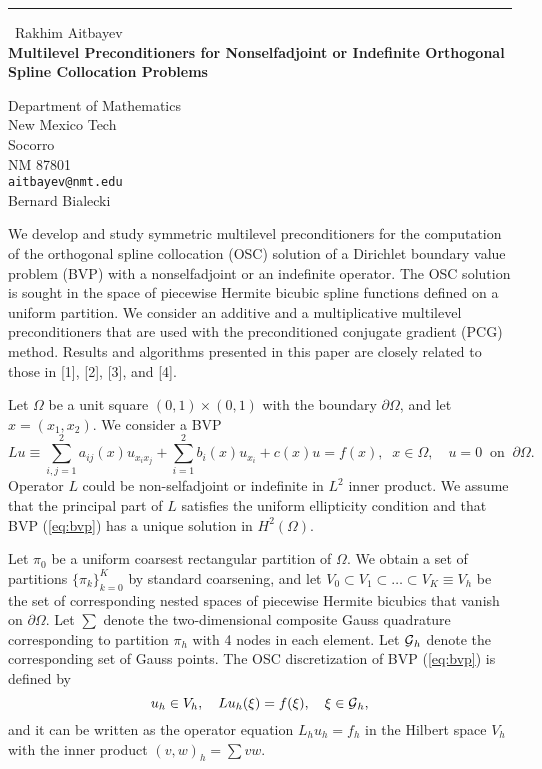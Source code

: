 \documentclass{report}
\begin{document}
\begin{center}
\rule{6in}{1pt} \
{\large Rakhim Aitbayev \\
{\bf Multilevel Preconditioners for Nonselfadjoint or Indefinite Orthogonal Spline Collocation Problems}}

Department of Mathematics  \\ New Mexico Tech  \\ Socorro \\ NM 87801
\\
{\tt aitbayev@nmt.edu}\\
Bernard Bialecki\end{center}

\newcommand{\GP}{\mbox{${\cal G}$}}
\newcommand{\SH}{\mbox{$\scriptscriptstyle H^{2}(\Omega)$}}
\newcommand{\SL}{\mbox{$\scriptscriptstyle L^{2}(\Omega)$}}

We develop and study symmetric multilevel preconditioners for
the computation of the orthogonal spline collocation (OSC) solution of a
Dirichlet boundary value problem (BVP) with a nonselfadjoint or an
indefinite operator. The OSC solution is sought in the space of
piecewise Hermite bicubic spline functions defined on a uniform
partition. We consider an additive and a multiplicative multilevel
preconditioners that are used with the preconditioned conjugate
gradient (PCG) method. Results and algorithms presented in this paper
are closely related to those in [1], [2], [3], and [4].

Let $\Omega$ be a unit square $(0,1)\times(0,1)$ with the boundary
$\partial\Omega$, and let $x=(x_1,x_2)$. We consider a BVP
\begin{equation}
\label{eq:bvp}
Lu\equiv\sum_{i,j=1}^{2} a_{ij}(x)u_{x_ix_j}+\sum_{i=1}^{2} b_i(x)
u_{x_i} +c(x)u = f(x),
\;\;x\in\Omega,\quad u=0 \;\;\mbox{on}\;\;\partial\Omega.
\end{equation}
Operator $L$ could be non-selfadjoint or indefinite in $L^2$ inner
product. We assume that the principal part of $L$ satisfies the
uniform ellipticity condition and that BVP (\ref{eq:bvp}) has a
unique solution in $H^2(\Omega)$.

Let $\pi_0$ be a uniform coarsest rectangular partition of $\Omega$.
We obtain a set of partitions $\{\pi_k\}_{k=0}^{K}$ by standard
coarsening, and let $V_0\subset V_1\subset\ldots\subset V_K\equiv V_h$
be the set of corresponding nested spaces of piecewise Hermite
bicubics that vanish on $\partial\Omega$. Let $\sum$ denote the
two-dimensional composite Gauss quadrature corresponding to partition
$\pi_h$ with 4 nodes in each element. Let $\GP_h$ denote the
corresponding set of Gauss points. The OSC discretization of BVP
(\ref{eq:bvp}) is defined by
\begin{equation}
\label{eq:osc}
u_h\in V_h,\quad Lu_h(\xi)=f(\xi),\quad\xi\in\GP_h,
\end{equation}
and it can be written as the operator equation $L_hu_h=f_h$ in the
Hilbert space $V_h$ with the inner product $(v,w)_h=\sum vw$.
\end{document}
